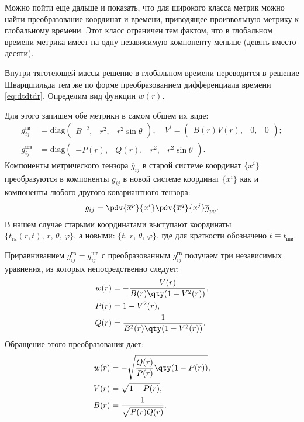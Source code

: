 \documentclass[\docroot/reports/draft/report.tex]{subfiles}
\begin{document}
    Можно пойти еще дальше и показать, что для широкого класса метрик можно найти преобразование координат и времени, приводящее произвольную метрику к глобальному времени. Этот класс ограничен тем фактом, что в глобальном времени метрика имеет на одну независимую компоненту меньше (девять вместо десяти).

    Внутри тяготеющей массы решение в глобальном времени переводится в решение Шварцшильда тем же по форме преобразованием дифференциала времени \autoref{eq:dtdtdr}. Определим вид функции $w(r)$.

    Для этого запишем обе метрики в самом общем их виде:
    \begin{align*}
        g_{ij}^\text{гв} &= \text{diag} \begin{pmatrix}B^{-2}, & r^2, & r^2 \sin\theta\end{pmatrix} , \quad
        V^i = \begin{pmatrix}B(r)V(r), & 0, & 0\end{pmatrix} ; \\
        g_{ij}^\text{шв} &= \text{diag} \begin{pmatrix}-P(r), & Q(r), & r^2, & r^2 \sin\theta\end{pmatrix} .
    \end{align*}
    Компоненты метрического тензора $\overline{g}_{ij}$ в старой системе координат $\{\overline{x}^i\}$ преобразуются в компоненты $g_{ij}$ в новой системе координат $\{x^i\}$ как и компоненты любого другого ковариантного тензора:
    \begin{equation*}
        g_{ij} = \pdv{\overline{x}^p}{x^i}\pdv{\overline{x}^q}{x^j} \overline{g}_{pq} .
    \end{equation*}
    В нашем случае старыми координатами выступают координаты $\{t_\text{гв}(r,t),\,r,\,\theta,\,\varphi\}$, а новыми: $\{t,\,r,\,\theta,\,\varphi\}$, где для краткости обозначено $t \equiv t_\text{шв}$.

    Приравниванием $g_{ij}^\text{гв} = g_{ij}^\text{шв}$ с преобразованным $g_{ij}^\text{гв}$ получаем три независимых уравнения, из которых непосредственно следует:
    \begin{align*}
        w(r) &= - \frac{V(r)}{B(r) \qty(1 - V^2(r))}, \\
        P(r) &= 1 - V^2(r), \\
        Q(r) &= \frac{1}{B^2(r) \qty(1 - V^2(r))} .
    \end{align*}
    Обращение этого преобразования дает:
    \begin{align*}
        w(r) &= - \sqrt{\frac{Q(r)}{P(r)} \qty(1 - P(r))}, \\
        V(r) &= \sqrt{1 - P(r)}, \\
        B(r) &= \frac{1}{\sqrt{P(r)Q(r)}} .
    \end{align*}
\end{document}
